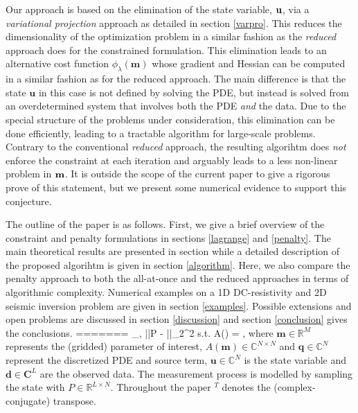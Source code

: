 \documentclass{iopart}
\begin{document}
{Our approach is based on the elimination of the state variable, $\mathbf{u}$, via a \emph{variational projection} approach as detailed in section \ref{varpro}. This reduces the dimensionality of the optimization problem in a similar fashion as the \emph{reduced} approach does for the constrained formulation. This elimination leads to an alternative cost function $\phi_{\lambda}(\mathbf{m})$ whose gradient and Hessian can be computed in a similar fashion as for the reduced approach. The main difference is that the state $\mathbf{u}$ in this case is not defined by solving the PDE, but instead is solved from an overdetermined system that involves both the PDE \emph{and} the data. Due to the special structure of the problems under consideration, this elimination can be done efficiently, leading to a tractable algorithm for large-scale problems. Contrary to the conventional \emph{reduced} approach, the resulting algorihtm does \emph{not} enforce the constraint at each iteration and arguably leads to a less non-linear problem in $\mathbf{m}$. It is outside the scope of the current paper to give a rigorous prove of this statement, but we present some numerical evidence to support this conjecture.

The outline of the paper is as follows. First, we give a brief overview of the constraint and penalty formulations in sections \ref{lagrange} and \ref{penalty}. The main theoretical results are presented in section \label{varpro} while 
a detailed description of the proposed algorihtm is given in section \ref{algorithm}.
Here, we also compare the penalty approach to both the all-at-once and the
reduced approaches in terms of algorithmic complexity.
Numerical examples on a 1D DC-resistivity and 2D seismic inversion problem are given in section \ref{examples}. Possible extensions and open problems are discussed in section
\ref{discussion} and section \ref{conclusion} gives the conclusions.
=======
\min_{,} ||P - ||_2^2  \quad 
\mbox{s.t.} \quad A() = ,
\eq
where $\mathbf{m}\in\mathbb{R}^{M}$ represents the (gridded) parameter of interest, $A(\mathbf{m})\in\mathbb{C}^{N\times N}$ and $\mathbf{q}\in\mathbb{C}^{N}$ represent the discretized PDE and source term, $\mathbf{u}\in\mathbb{C}^{N}$ is the state variable and $\mathbf{d}\in \mathbf{C}^{L}$ are the observed data. The measurement process is modelled by sampling the state with $P\in \mathbb{R}^{L\times N}$. Throughout the paper $^T$ denotes the (complex-conjugate) transpose.  

}
\end{document}
